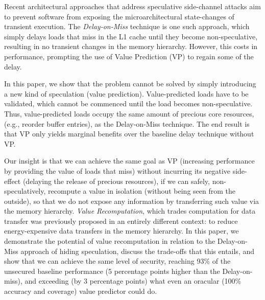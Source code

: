 Recent architectural approaches that address speculative side-channel attacks aim to prevent software from exposing the microarchitectural state-changes
of transient execution.
The \emph{Delay-on-Miss} technique is one such approach, which
simply delays loads that miss in the L1 cache until they become non-speculative, resulting in no transient changes in the memory hierarchy.
However, this costs in performance, prompting the use of Value Prediction (VP) to regain some of the delay.

In this paper, we show that the problem cannot be solved by simply introducing a new kind of speculation (value prediction). %
Value-predicted loads have to be validated, which cannot be commenced until the load becomes non-speculative. %
Thus, value-predicted loads occupy the same amount of precious core resources, (e.g., reorder buffer entries), as the Delay-on-Miss technique. %
The end result is that VP only yields marginal benefits over the baseline delay technique without VP. %

Our insight is that we can achieve the same goal as VP (increasing performance by providing the value of loads that miss) without incurring its negative side-effect (delaying the release of precious resources), 
if we can safely, non-speculatively, recompute a value in isolation (without being seen from the outside), so that we do not expose any information
by transferring such value via the memory hierarchy.
\emph{Value Recomputation}, which trades computation for data transfer 
was previously proposed in an entirely different context: to reduce energy-expensive data transfers in the memory hierarchy. 
In this paper, we demonstrate the potential of value recomputation in relation to the Delay-on-Miss approach of hiding speculation, discuss the trade-offs that this entails, and show that we can achieve the same level of security, reaching 93\% of the unsecured baseline performance (5 percentage points higher than the Delay-on-miss), and exceeding (by 3 percentage points) what even an oracular (100\% accuracy and coverage) value predictor could do.

